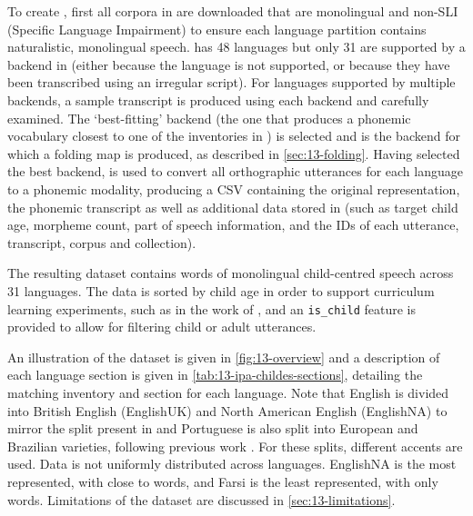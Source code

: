 To create \ipachildes, first all corpora in \childes are downloaded that are monolingual and non-SLI (Specific Language Impairment) to ensure each language partition contains naturalistic, monolingual speech. \childes has 48 languages but only 31 are supported by a backend in \gpp (either because the language is not supported, or because they have been transcribed using an irregular script). For languages supported by multiple backends, a sample transcript is produced using each backend and carefully examined. The `best-fitting' backend (the one that produces a phonemic vocabulary closest to one of the inventories in \phoible) is selected and is the backend for which a folding map is produced, as described in \cref{sec:13-folding}. Having selected the best backend, \gpp is used to convert all orthographic utterances for each language to a phonemic modality, producing a CSV containing the original representation, the phonemic transcript as well as additional data stored in \childes (such as target child age, morpheme count, part of speech information, and the IDs of each utterance, transcript, corpus and collection). 

The resulting dataset contains  words of monolingual child-centred speech across 31 languages. The data is sorted by child age in order to support curriculum learning experiments, such as in the work of \citet{huebner-etal-2021-babyberta}, and an \texttt{is\_child} feature is provided to allow for filtering child or adult utterances.

An illustration of the dataset is given in \cref{fig:13-overview} and a description of each language section is given in \cref{tab:13-ipa-childes-sections}, detailing the matching \phoible inventory and \childes section for each language. Note that English is divided into British English (EnglishUK) and North American English (EnglishNA) to mirror the split present in \childes and Portuguese is also split into European and Brazilian varieties, following previous work \citep{caines2019cross}. For these splits, different \phonemizer accents are used. Data is not uniformly distributed across languages. EnglishNA is the most represented, with close to  words, and Farsi is the least represented, with only  words. Limitations of the dataset are discussed in \cref{sec:13-limitations}.


